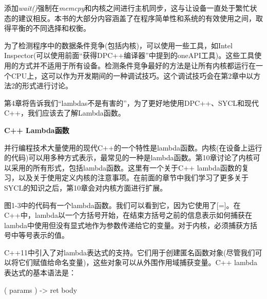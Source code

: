 添加\textit{wait()}强制在\textit{memcpy}和内核之间进行主机同步，这与让设备一直处于繁忙状态的建议相反。本书的大部分内容涵盖了在程序简单性和系统的有效使用之间，取得平衡的不同选择和权衡。\par

为了检测程序中的数据条件竞争(包括内核)，可以使用一些工具，如Intel Inspector(可以使用前面“获得DPC++编译器”中提到的oneAPI工具)。这些工具使用的方式并不适用于所有设备。检测条件竞争最好的方法是让所有内核都运行在一个CPU上，这可以作为开发期间的一种调试技巧。这个调试技巧会在第2章中以方法2的形式进行讨论。\par

\begin{tcolorbox}[colback=red!5!white,colframe=red!75!black]
第4章将告诉我们“lambdas不是有害的”，为了更好地使用DPC++、SYCL和现代C++，我们应该去了解Lambda函数。
\end{tcolorbox}

\hspace*{\fill} \par %
\textbf{C++ Lambda函数}

并行编程技术大量使用的现代C++的一个特性是lambda函数。内核(在设备上运行的代码)可以用多种方式表示，最常见的一种是lambda函数。第10章讨论了内核可以采用的所有形式，包括lambda函数。这里有一个关于C++ lambda函数的复习，以及关于使用定义内核的注意事项。在前面的章节中我们学习了更多关于SYCL的知识之后，第10章会对内核方面进行扩展。\par

图1-3中的代码有一个lambda函数。我们可以看到它，因为它使用了[=]。在C++中，lambda以一个方括号开始，在结束方括号之前的信息表示如何捕获在lambda中使用但没有显式地作为参数传递给它的变量。对于内核，必须捕获方括号中等号表示的值。\par

C++11中引入了对lambda表达式的支持。它们用于创建匿名函数对象(尽管我们可以将它们赋值给命名变量)，这些对象可以从外围作用域捕获变量。C++ lambda表达式的基本语法是：\par

\begin{tcolorbox} ( params ) -> ret { body }
\end{tcolorbox}


